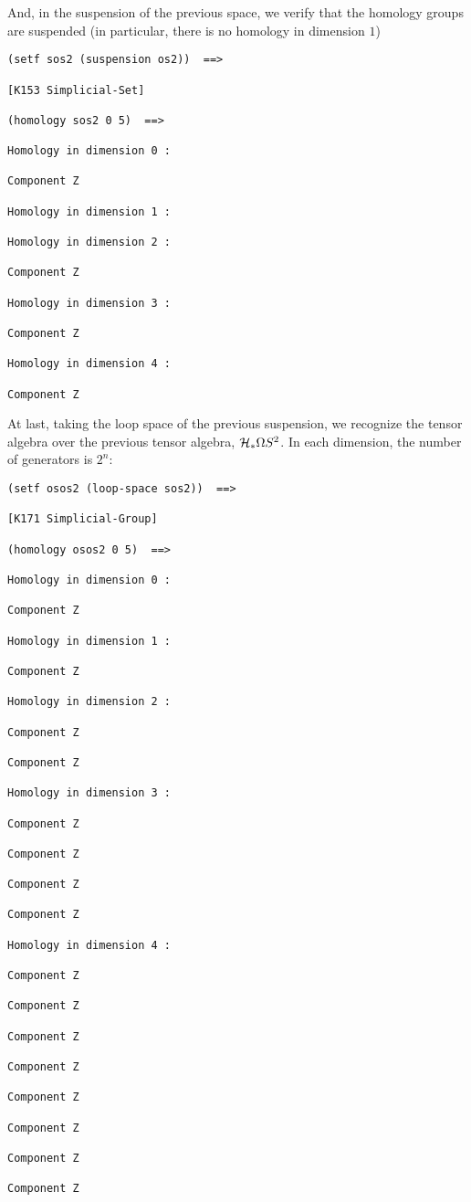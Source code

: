 And, in the suspension of the previous space, we verify that the homology groups
are suspended (in particular, there is no homology in dimension $1$)
{\footnotesize\begin{verbatim}
(setf sos2 (suspension os2))  ==>

[K153 Simplicial-Set]

(homology sos2 0 5)  ==>

Homology in dimension 0 :

Component Z

Homology in dimension 1 :

Homology in dimension 2 :

Component Z

Homology in dimension 3 :

Component Z

Homology in dimension 4 :

Component Z
\end{verbatim}}
At last, taking the loop space of the previous suspension, we recognize the tensor
algebra over the previous tensor algebra, ${\cal H}_*\Omega S^2$. In each dimension, the
number of generators is $2^n$:
{\footnotesize\begin{verbatim}
(setf osos2 (loop-space sos2))  ==>

[K171 Simplicial-Group]

(homology osos2 0 5)  ==>

Homology in dimension 0 :

Component Z

Homology in dimension 1 :

Component Z

Homology in dimension 2 :

Component Z

Component Z

Homology in dimension 3 :

Component Z

Component Z

Component Z

Component Z

Homology in dimension 4 :

Component Z

Component Z

Component Z

Component Z

Component Z

Component Z

Component Z

Component Z
\end{verbatim}}

